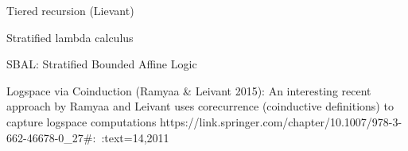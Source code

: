 Tiered recursion (Lievant)

Stratified lambda calculus

SBAL: Stratified Bounded Affine Logic 

Logspace via Coinduction (Ramyaa & Leivant 2015): An interesting recent approach by Ramyaa and Leivant uses corecurrence (coinductive definitions) to capture logspace computations
https://link.springer.com/chapter/10.1007/978-3-662-46678-0_27#:~:text=14,2011

